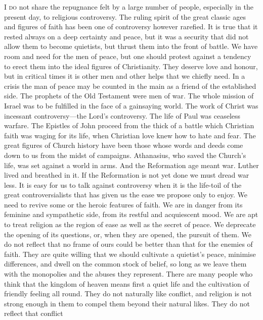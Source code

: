 \documentclass[12pt,a5paper,twoside]{book}
\begin{document}
\textsc{I do} not share the repugnance felt by a large 
number of people, especially in the present day, to 
religious controversy. The ruling spirit of the great 
classic ages and figures of faith has been one of controversy 
however rarefied. It is true that it rested 
always on a deep certainty and peace, but it was a security 
that did not allow them to become quietists, but 
thrust them into the front of battle. We have room 
and need for the men of peace, but one should protest 
against a tendency to erect them into the ideal figures 
of Christianity. They deserve love and honour, but in 
critical times it is other men and other helps that we 
chiefly need. In a crisis the man of peace may be 
counted in the main as a friend of the established side. 
The prophets of the Old Testament were men of war. 
The whole mission of Israel was to be fulfilled in the 
face of a gainsaying world. The work of Christ 
was incessant controversy---the Lord's controversy. 
The life of Paul was ceaseless warfare. The Epistles 
of John proceed from the thick of a battle which 
Christian faith was waging for its life, when 
Christian love knew how to hate and fear. The 
great figures of Church history have been those 
whose words and deeds come down to us from the 
midst of campaigns. Athanasius, who saved the 
Church's life, was set against a world in arms. And 
the Reformation age meant war. Luther lived and 
breathed in it. If the Reformation is not yet done 
we must dread war less. It is easy for us to talk 
against controversy when it is the life-toil of the 
great controversialists that has given us the ease we 
propose only to enjoy. We need to revive some or 
the heroic features of faith. We are in danger from 
its feminine and sympathetic side, from its restful and 
acquiescent mood. We are apt to treat religion as 
the region of ease as well as the secret of peace. We 
deprecate the opening of its questions, or, when they 
are opened, the pursuit of them. We do not reflect 
that no frame of ours could be better than that for the 
enemies of faith. They are quite willing that we 
should cultivate a quietist's peace, minimise differences, 
and dwell on the common stock of belief, so long as 
we leave them with the monopolies and the abuses 
they represent. There are many people who think 
that the kingdom of heaven means first a quiet life 
and the cultivation of friendly feeling all round. 
They do not naturally like conflict, and religion is 
not strong enough in them to compel them beyond 
their natural likes. They do not reflect that conflict 
\end{document}
